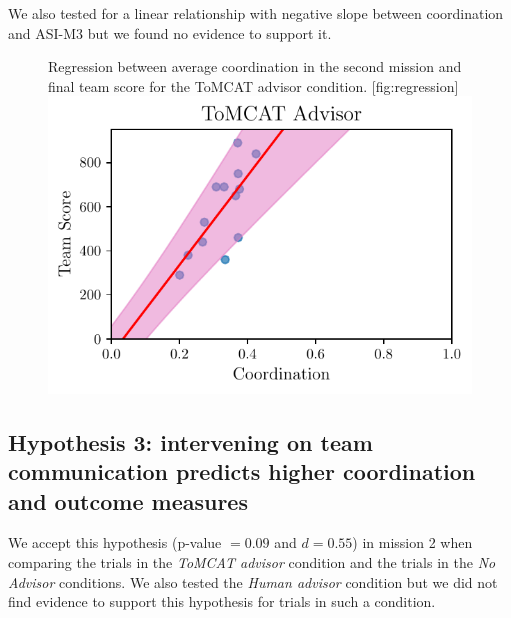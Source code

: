 We also tested for a linear relationship with negative slope between
coordination and ASI-M3 but we found no evidence to support it.

\begin{figure}[h]
	\centering
    \begin{sidecaption}{%
        Regression between average coordination in the second mission and final
        team score for the ToMCAT advisor condition.
    }[fig:regression]
    \includegraphics{figures/tomcat_score_slope.pdf}
\end{sidecaption}
\end{figure}


\subsection{Hypothesis 3: intervening on team communication predicts higher
coordination and outcome measures}

We accept this hypothesis (p-value $= 0.09$ and $d = 0.55$) in mission 2 when
comparing the trials in the \emph{ToMCAT advisor} condition and the trials in
the \emph{No Advisor} conditions. We also tested the \emph{Human advisor}
condition but we did not find evidence to support this hypothesis for trials in
such a condition.
